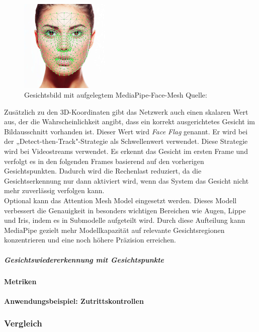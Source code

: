\begin{figure}
    \centering
    \includegraphics[width=0.38\textwidth]{data/face_mesh.png}
    \caption{\footnotesize Gesichtsbild mit aufgelegtem MediaPipe-Face-Mesh \newline Quelle: \cite{face_mesh}}
\end{figure}

Zusätzlich zu den 3D-Koordinaten gibt das Netzwerk auch einen skalaren Wert aus, der die Wahrscheinlichkeit angibt, dass ein korrekt ausgerichtetes Gesicht im Bildausschnitt vorhanden ist. Dieser Wert wird \textit{Face Flag} genannt. Er wird bei der „Detect-then-Track"-Strategie als Schwellenwert verwendet. Diese Strategie wird bei Videostreams verwendet. Es erkennt das Gesicht im ersten Frame und verfolgt es in den folgenden Frames basierend auf den vorherigen Gesichtspunkten. Dadurch wird die Rechenlast reduziert, da die Gesichtserkennung nur dann aktiviert wird, wenn das System das Gesicht nicht mehr zuverlässig verfolgen kann. \cite{Kartynnik.2019}\\
Optional kann das Attention Mesh Model eingesetzt werden. Dieses Modell verbessert die Genauigkeit in besonders wichtigen Bereichen wie Augen, Lippe und Iris, indem es in Submodelle aufgeteilt wird. Durch diese Aufteilung kann MediaPipe gezielt mehr Modellkapazität auf relevante Gesichtsregionen konzentrieren und eine noch höhere Präzision erreichen. \cite{Grishchenko.2020} \\


\subparagraph{Gesichtswiedererkennung mit Gesichtspunkte}
\paragraph{Metriken}
\paragraph{Anwendungsbeispiel: Zutrittskontrollen}

\subsubsection{Vergleich}
